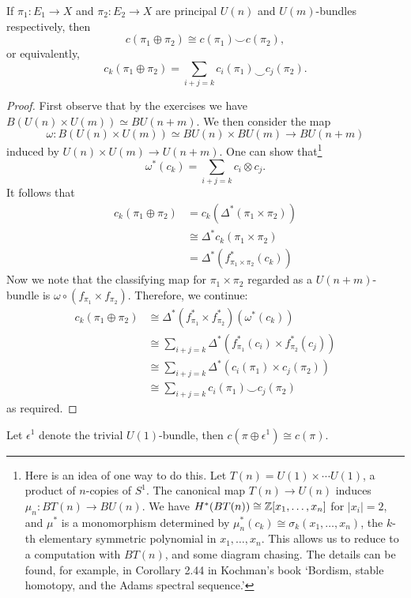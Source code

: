 \documentclass[ma3408.tex]{subfiles}
\begin{document}
\begin{Prop}
If $\pi_1 \colon E_1 \to X$ and $\pi_2 \colon E_2 \to X$ are principal $U(n)$ and $U(m)$-bundles respectively, then
\[
c(\pi_1 \oplus \pi_2) \cong c(\pi_1) \smile c(\pi_2),
\]
or equivalently,
\[
c_k(\pi_1 \oplus \pi_2) = \sum_{i+j = k}c_i(\pi_1) \smile c_j(\pi_2).
\]
\end{Prop}
\begin{proof}
First observe that by the exercises we have $B(U(n) \times U(m)) \simeq BU(n+m)$. We then consider the map
\[
\omega \colon B(U(n) \times U(m)) \simeq BU(n) \times BU(m) \to BU(n+m)
\]
induced by $U(n) \times U(m) \to U(n+m)$. One can show that\footnote{Here is an idea of one way to do this. Let $T(n) = U(1) \times \cdots U(1)$, a product of $n$-copies of $S^1$. The canonical map $T(n) \to U(n)$ induces $\mu_n \colon BT(n) \to BU(n)$. We have $H^*(BT(n)) \cong \mathbb{Z}[x_1,\ldots,x_n]$ for $|x_i|  = 2$, and $\mu^*$ is a monomorphism determined by $\mu_n^*(c_k) \cong \sigma_k(x_1,\ldots, x_n)$, the $k$-th elementary symmetric polynomial in $x_1,\ldots,x_n$. This allows us to reduce to a computation with $BT(n)$, and some diagram chasing. The details can be found, for example, in Corollary 2.44 in Kochman's book `Bordism, stable homotopy, and the Adams spectral sequence.' }
\[
\omega^*(c_k) = \sum_{i+j = k}c_i \otimes c_j.
\]
It follows that
\[
\begin{split}
c_k(\pi_1 \oplus \pi_2) & = c_k(\Delta^\ast(\pi_1 \times \pi_2)) \\
& \cong \Delta^*c_k(\pi_1 \times \pi_2) \\
& = \Delta^*(f^*_{\pi_1 \times \pi_2}(c_k))
\end{split}
\]
Now we note that the classifying map for $\pi_1 \times \pi_2$ regarded as a $U(n+m)$-bundle is $\omega \circ (f_{\pi_1} \times f_{\pi_2})$. Therefore, we continue:
\[
\begin{split}
c_k(\pi_1 \oplus \pi_2) & \cong \Delta^*(f^*_{\pi_1} \times f^*_{\pi_2})(\omega^*(c_k)) \\
& \cong \sum_{i+j=k} \Delta^*(f^*_{\pi_1}(c_i) \times f^*_{\pi_2}(c_j)) \\
& \cong \sum_{i+j=k} \Delta^*(c_i(\pi_1) \times c_j(\pi_2)) \\ 
& \cong \sum_{i+j=k} c_i(\pi_1) \smile c_j(\pi_2) 
\end{split}
\]
as required.
\end{proof}
\begin{Cor}
Let $\epsilon^1$ denote the trivial $U(1)$-bundle, then $c(\pi \oplus \epsilon^1) \cong c(\pi)$. 
\end{Cor}
\end{document}
